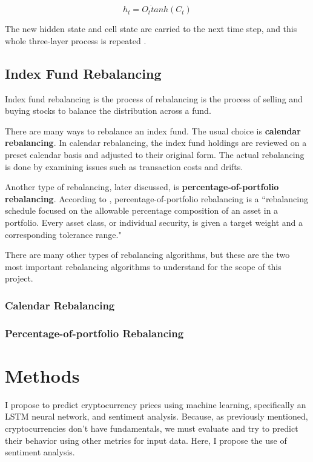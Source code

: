 \documentclass[10pt,twocolumn]{article}
\begin{document}
\[
h_t = O_t \dot tanh(C_t)
\]

The new hidden state and cell state are carried to the next time step, and this whole three-layer process is repeated \cite{IllustratedGuideToLSTMs}.


\subsection{Index Fund Rebalancing}

Index fund rebalancing is the process of rebalancing is the process of selling and buying stocks to balance the distribution across a fund.

There are many ways to rebalance an index fund. The usual choice is \textbf{calendar rebalancing}. In calendar rebalancing, the index fund holdings are reviewed on a preset calendar basis and adjusted to their original form. The actual rebalancing is done by examining issues such as transaction costs and drifts.

Another type of rebalancing, later discussed, is \textbf{percentage-of-portfolio rebalancing}. According to , percentage-of-portfolio rebalancing is a ``rebalancing schedule focused on the allowable percentage composition of an asset in a portfolio. Every asset class, or individual security, is given a target weight and a corresponding tolerance range."

There are many other types of rebalancing algorithms, but these are the two most important rebalancing algorithms to understand for the scope of this project.

\subsubsection{Calendar Rebalancing}

\subsubsection{Percentage-of-portfolio Rebalancing}

\section{Methods}

I propose to predict cryptocurrency prices using machine learning, specifically an LSTM neural network, and sentiment analysis. Because, as previously mentioned, cryptocurrencies don’t have fundamentals, we must evaluate and try to predict their behavior using other metrics for input data. Here, I propose the use of sentiment analysis.
\end{document}
